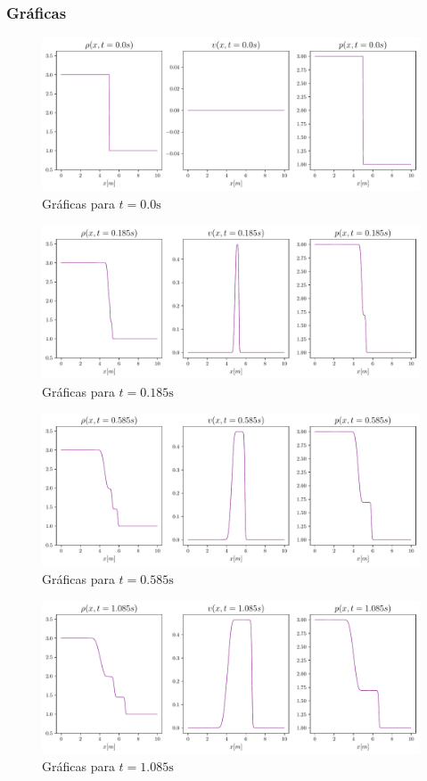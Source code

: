 \subsubsection{Gráficas}
\begin{figure}[ht]
	\centering
	\includegraphics[width=1\linewidth]{../euler1D/plots_en_TDG/set2/1.pdf}
	\caption{Gráficas para $t=0.0\unit{\s}$}
	\label{fig:set2-1}
\end{figure}
\begin{figure}[ht]
	\includegraphics[width=1\linewidth]{../euler1D/plots_en_TDG/set2/20.pdf}
	\caption{Gráficas para $t=0.185\unit{\s}$}
	\label{fig:set2-2}
\end{figure}
\begin{figure}[ht]
	\includegraphics[width=1\linewidth]{../euler1D/plots_en_TDG/set2/60.pdf}
	\caption{Gráficas para $t=0.585\unit{\s}$}
	\label{fig:set2-3}
\end{figure}
\begin{figure}[ht]
	\includegraphics[width=1\linewidth]{../euler1D/plots_en_TDG/set2/110.pdf}
	\caption{Gráficas para $t=1.085\unit{\s}$}
	\label{fig:set2-4}
\end{figure}
